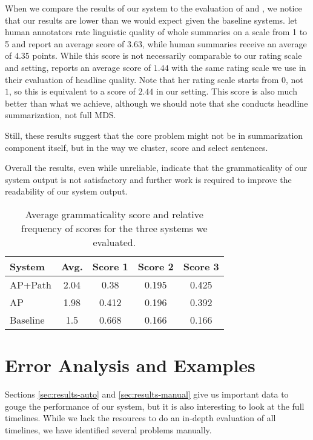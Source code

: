 \documentclass[a4paper,BCOR=10mm]{report}
\numberwithin{lemma}{chapter}
\numberwithin{definition}{chapter}
\begin{document}
When we compare the results of our system to the evaluation of \citet{banerjee} and \citet{filippova}, we notice that our results are lower than we would expect given the baseline systems. \citet{banerjee} let human annotators rate linguistic quality of whole summaries on a scale from 1 to 5 and report an average score of $3.63$, while human summaries receive an average of $4.35$ points.
While this score is not necessarily comparable to our rating scale and setting, \citet{filippova} reports an average score of $1.44$ with the same rating scale we use in their evaluation of headline quality. Note that her rating scale starts from $0$, not $1$, so this is equivalent to a score of $2.44$ in our setting. This score is also much better than what we achieve, although we should note that she conducts headline summarization, not full MDS.

Still, these results suggest that the core problem might not be in summarization component itself, but in the way we cluster, score and select sentences.

Overall the results, even while unreliable, indicate that the grammaticality of our system output is not satisfactory and further work is required to improve the readability of our system output.

\begin{table}

\centering\begin{tabular}{|l|c|ccc|}
\hline
\textbf{System} & \textbf{Avg.} & \textbf{Score 1} & \textbf{Score 2} & \textbf{Score 3} \\\hline
AP+Path &  2.04 & 0.38 & 0.195 & 0.425 \\
AP & 1.98 & 0.412 & 0.196 & 0.392 \\
Baseline & 1.5 & 0.668 & 0.166 & 0.166 \\\hline
\end{tabular}


\caption{Average grammaticality score and relative frequency of scores for the three systems we evaluated.}
\label{tab:results-manual}
\end{table}

\chapter{Error Analysis and Examples}  \label{sec:errors}

Sections \ref{sec:results-auto} and \ref{sec:results-manual} give us important data to gouge the performance of our system, but it is also interesting to look at the full timelines.
While we lack the resources to do an in-depth evaluation of all timelines, we have identified several problems manually.
\end{document}
